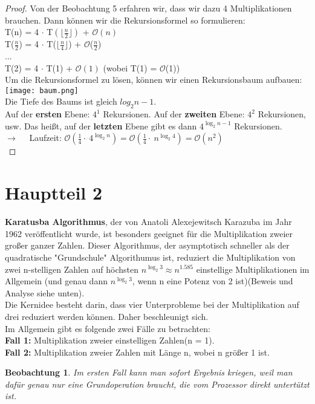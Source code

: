 \documentclass[11pt,a4paper, twoside]{article}
\newtheorem{observation}[theorem]{Beobachtung}
\theoremstyle{definition}
\begin{document}
\begin{proof}
Von der Beobachtung 5 erfahren wir, dass wir dazu 4 Multiplikationen brauchen. Dann können wir die Rekursionsformel so formulieren: \\
\quad		T(n) = 4 $\cdot$ T$(\lfloor \frac{n}{2}\rfloor)$ + $\mathcal{O}(n)$\\
\quad		T($\frac{n}{2}$) = 4 $\cdot$ T($\lfloor \frac{n}{4}\rfloor$) + $\mathcal{O}$($\frac{n}{2}$)\\
\quad		...\\
\quad		T(2) = 4 $\cdot$ T(1) + $\mathcal{O}(1)$ \quad (wobei T(1) = $\mathcal{O}$(1))\\
Um die Rekursionsformel zu lösen, können wir einen Rekursionsbaum aufbauen: \\
\texttt{[image: baum.png]} \cite{3}\\
Die Tiefe des Baums ist gleich $log_{2}{n}- 1$.\\
Auf der \textbf{ersten} Ebene: $4^{1}$ Rekursionen. Auf der \textbf{zweiten} Ebene: $4^{2}$ Rekursionen, usw. Das heißt, auf der \textbf{letzten} Ebene gibt es dann $4^{\log_2{n} - 1}$ Rekursionen.\\
$\rightarrow \quad$ Laufzeit: $ \mathcal{O}(\frac{1}{4}\cdot \ 4^{\log_{2}{n}}) = \mathcal{O}(\frac{1}{4} \cdot \ n^{\log_{2}{4} }) = \mathcal{O} (n^{2})$\\
\end{proof}

\section{Hauptteil 2}
\textbf{Karatusba Algorithmus}, der von Anatoli Alexejewitsch Karazuba im Jahr 1962 veröffentlicht wurde, ist besonders geeignet für die Multiplikation zweier großer ganzer Zahlen. Dieser Algorithmus, der asymptotisch schneller als der quadratische "Grundschule"\- Algorithumus ist, reduziert die Multiplikation von zwei n-stelligen Zahlen auf höchsten $n^{\log_{2}{3}} \approx n^{1.585}$ einstellige Multiplikationen im Allgemein (und genau dann $n^{\log_{2}{3}}$, wenn n eine Potenz von 2 ist)(Beweis und Analyse siehe unten).\\

Die Kernidee besteht darin, dass vier Unterprobleme bei der Multiplikation auf drei reduziert werden können. Daher beschleunigt sich.
\\


Im Allgemein gibt es folgende zwei Fälle zu betrachten: \\
\textbf{Fall 1:} Multiplikation zweier einstelligen Zahlen(n = 1).\\
\textbf{Fall 2:} Multiplikation zweier Zahlen mit Länge n, wobei n größer 1 ist.\\
\begin{observation}
Im ersten Fall kann man sofort Ergebnis kriegen, weil man dafür genau nur eine Grundoperation braucht, die vom Prozessor direkt untertützt ist. 
\end{observation}
\end{document}
